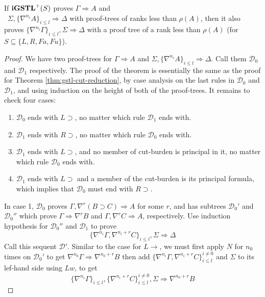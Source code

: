 \begin{thm}\label{thm:igstl-cut-reduction}
  If $\mathbf{iGSTL}^+(S)$ proves $\Gamma \Rightarrow A$ and\\\ $\Sigma , \{\nabla^{n_i} A\}_{i \leq l} \Rightarrow \Delta$ with proof-trees of ranks less than $\rho(A)$, then it also proves $\{\nabla^{n_i} \Gamma\}_{i \leq l} , \Sigma \Rightarrow \Delta$ with a proof tree of a rank less than $\rho(A)$ (for $S \subseteq \{L, R, Fa, Fu\}$).
\end{thm}
\begin{proof}
  We have two proof-trees for $\Gamma \Rightarrow  A$ and $\Sigma , \{\nabla^{n_i} A\}_{i \leq l} \Rightarrow \Delta$. Call them $\mathcal{D}_0$ and $\mathcal{D}_1$ respectively. The proof of the theorem is essentially the same as the proof for Theorem \ref{thm:gstl-cut-reduction}, by case analysis on the last rules in $\mathcal{D}_0$ and $\mathcal{D}_1$, and using induction on the height of both of the proof-trees. It remains to check four cases:
  \begin{enumerate}
    \item $\mathcal{D}_0$ ends with $L \supset$, no matter which rule $\mathcal{D}_1$ ends with.
    \item $\mathcal{D}_1$ ends with $R \supset$, no matter which rule $\mathcal{D}_0$ ends with.
    \item $\mathcal{D}_1$ ends with $L \supset$, and no member of cut-burden is principal in it, no matter which rule $\mathcal{D}_0$ ends with.
    \item $\mathcal{D}_1$ ends with $L \supset$ and a member of the cut-burden is its principal formula, which implies that $\mathcal{D}_0$ must end with $R \supset$.
  \end{enumerate}
  In case 1, $\mathcal{D}_0$ proves $\Gamma, \nabla^r (B \supset C) \Rightarrow A$ for some $r$, and has subtrees $\mathcal{D}_0'$ and $\mathcal{D}_0''$ which prove $\Gamma \Rightarrow \nabla^r B$ and $\Gamma, \nabla^r C \Rightarrow A$, respectively. Use induction hypothesis for $\mathcal{D}_0''$ and $\mathcal{D}_1$ to prove
  $$\{ \nabla^{n_i} \Gamma, \nabla^{n_i+r} C \}_{i \leq l}, \Sigma \Rightarrow \Delta$$
  Call this sequent $\mathcal{D}'$. Similar to the case for $L \rightarrow$, we must first apply $N$ for $n_0$ times on $\mathcal{D}_0'$ to get $\nabla^{n_0} \Gamma \Rightarrow \nabla^{n_0+r} B$ then add $\{\nabla^{n_i} \Gamma, \nabla^{n_i+r}C\}_{i \leq l}^{i \neq 0}$ and $\Sigma$ to its lef-hand side using $Lw$, to get
  $$\{\nabla^{n_i} \Gamma\}_{i \leq l}, \{\nabla^{n_i+r}C\}_{i \leq l}^{i \neq 0}, \Sigma \Rightarrow \nabla^{n_0+r} B$$

\end{proof}

